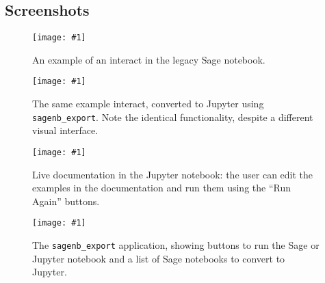 \documentclass{deliverablereport}
\begin{document}
\clearpage
\appendix
\begin{landscape}
\section{Screenshots}

\newcommand{\screenshot}[2]{
\begin{figure}[ht]
  \texttt{[image: \#1]}
  \caption{#2}
\end{figure}}

\screenshot{interact-sagenb.png}{\label{fig-interact-sagenb}
  An example of an interact in the legacy Sage notebook.}
\screenshot{interact-jupyter.png}{\label{fig-interact-jupyter}
  The same example interact, converted to Jupyter using \texttt{sagenb\_export}.
  Note the identical functionality, despite a different visual interface.}
\screenshot{live-doc.png}{\label{fig-live-doc}
  Live documentation in the Jupyter notebook:
  the user can edit the examples in the documentation and run them
  using the ``Run Again'' buttons.}
\screenshot{export.png}{\label{fig-export}
  The \texttt{sagenb\_export} application, showing
  buttons to run the Sage or Jupyter notebook and a list of Sage notebooks
  to convert to Jupyter.}
\end{landscape}
\clearpage
\end{document}
